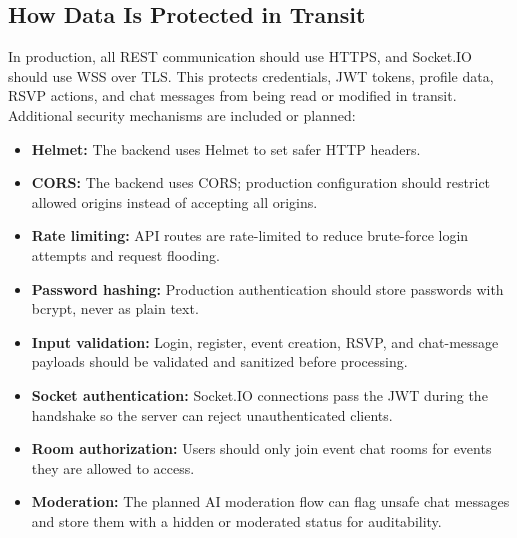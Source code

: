 \documentclass[12pt,a4paper]{article}
\begin{document}
\subsection{How Data Is Protected in Transit}
In production, all REST communication should use HTTPS, and Socket.IO should use WSS
over TLS. This protects credentials, JWT tokens, profile data, RSVP actions, and chat
messages from being read or modified in transit.
Additional security mechanisms are included or planned:
\begin{itemize}
  \item \textbf{Helmet:} The backend uses Helmet to set safer HTTP headers.
  \item \textbf{CORS:} The backend uses CORS; production configuration should restrict allowed origins instead of accepting all origins.
  \item \textbf{Rate limiting:} API routes are rate-limited to reduce brute-force login attempts and request flooding.
  \item \textbf{Password hashing:} Production authentication should store passwords with bcrypt, never as plain text.
  \item \textbf{Input validation:} Login, register, event creation, RSVP, and chat-message payloads should be validated and sanitized before processing.
  \item \textbf{Socket authentication:} Socket.IO connections pass the JWT during the handshake so the server can reject unauthenticated clients.
  \item \textbf{Room authorization:} Users should only join event chat rooms for events they are allowed to access.
  \item \textbf{Moderation:} The planned AI moderation flow can flag unsafe chat messages and store them with a hidden or moderated status for auditability.
\end{itemize}
\end{document}
